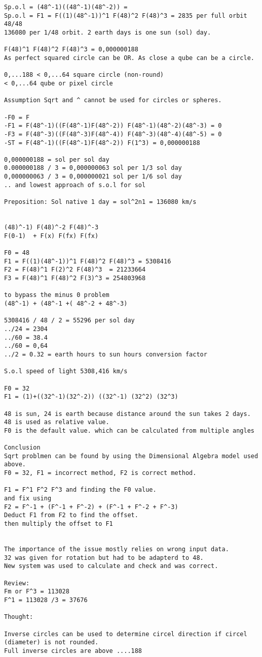 \documentclass{thesis}
\begin{document}
\begin{verbatim}
Sp.o.l = (48^-1)((48^-1)(48^-2)) = 
Sp.o.l = F1 = F((1)(48^-1))^1 F(48)^2 F(48)^3 = 2835 per full orbit 48/48
136080 per 1/48 orbit. 2 earth days is one sun (sol) day.

F(48)^1 F(48)^2 F(48)^3 = 0,000000188 
As perfect squared circle can be OR. As close a qube can be a circle. 

0,...188 < 0,...64 square circle (non-round)
< 0,...64 qube or pixel circle

Assumption Sqrt and ^ cannot be used for circles or spheres.

-F0 = F
-F1 = F(48^-1)((F(48^-1)F(48^-2)) F(48^-1)(48^-2)(48^-3) = 0
-F3 = F(48^-3)((F(48^-3)F(48^-4)) F(48^-3)(48^-4)(48^-5) = 0
-ST = F(48^-1)((F(48^-1)F(48^-2)) F(1^3) = 0,000000188

0,000000188 = sol per sol day
0.000000188 / 3 = 0,000000063 sol per 1/3 sol day
0,000000063 / 3 = 0,000000021 sol per 1/6 sol day 
.. and lowest approach of s.o.l for sol

Preposition: Sol native 1 day = sol^2n1 = 136080 km/s   


(48)^-1) F(48)^-2 F(48)^-3 
F(0-1)  + F(x) F(fx) F(fx)

F0 = 48
F1 = F((1)(48^-1))^1 F(48)^2 F(48)^3 = 5308416
F2 = F(48)^1 F(2)^2 F(48)^3  = 21233664
F3 = F(48)^1 F(48)^2 F(3)^3 = 254803968

to bypass the minus 0 problem
(48^-1) + (48^-1 +( 48^-2 + 48^-3)

5308416 / 48 / 2 = 55296 per sol day
../24 = 2304
../60 = 38.4
../60 = 0,64
../2 = 0.32 = earth hours to sun hours conversion factor

S.o.l speed of light 5308,416 km/s

F0 = 32
F1 = (1)+((32^-1)(32^-2)) ((32^-1) (32^2) (32^3)

48 is sun, 24 is earth because distance around the sun takes 2 days.
48 is used as relative value. 
F0 is the default value. which can be calculated from multiple angles

Conclusion
Sqrt problmen can be found by using the Dimensional Algebra model used above.
F0 = 32, F1 = incorrect method, F2 is correct method. 

F1 = F^1 F^2 F^3 and finding the F0 value.
and fix using
F2 = F^-1 + (F^-1 + F^-2) + (F^-1 + F^-2 + F^-3)
Deduct F1 from F2 to find the offset. 
then multiply the offset to F1


The importance of the issue mostly relies on wrong input data.
32 was given for rotation but had to be adapterd to 48.
New system was used to calculate and check and was correct.

Review:
Fm or F^3 = 113028
F^1 = 113028 /3 = 37676

Thought:

Inverse circles can be used to determine circel direction if circel (diameter) is not rounded.
Full inverse circles are above ....188

\end{verbatim}
\end{document}
